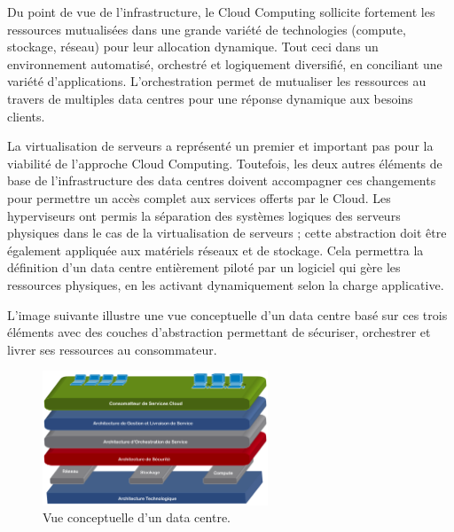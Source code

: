 Du point de vue de l'infrastructure, le Cloud Computing sollicite fortement les ressources mutualisées dans une grande variété de technologies (compute, stockage, réseau) pour leur allocation dynamique. Tout ceci dans un environnement automatisé, orchestré et logiquement diversifié, en conciliant une variété d'applications. L'orchestration permet de mutualiser les ressources au travers de multiples data centres pour une réponse dynamique aux besoins clients. 


La virtualisation de serveurs a représenté un premier et important pas pour la viabilité de l'approche Cloud Computing. Toutefois, les deux autres éléments de base de l'infrastructure des data centres doivent accompagner ces changements pour permettre un accès complet aux services offerts par le Cloud. Les hyperviseurs ont permis la séparation des systèmes logiques des serveurs physiques dans le cas de la virtualisation de serveurs ; cette abstraction doit être également appliquée aux matériels réseaux et de stockage. Cela permettra la définition d'un data centre entièrement piloté par un logiciel qui gère les ressources physiques, en les activant dynamiquement selon la charge applicative.


 L'image suivante illustre une vue conceptuelle d'un data centre basé sur ces trois éléments avec des couches d'abstraction permettant de sécuriser, orchestrer et livrer ses ressources au consommateur.\\

\begin{figure}[h]
\begin{center}

\includegraphics[width=0.6\textwidth]{images/CloudRefArchi_T} 
\caption{Vue conceptuelle d'un data centre. \cite{ciscoCCDCStrategyArchiSolutions}} \label{cloud_conceptual_view}

\end{center}
\end{figure}

